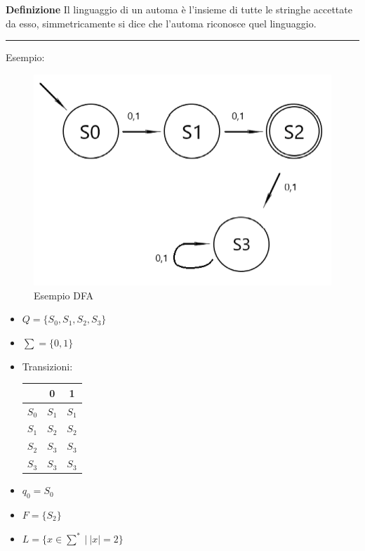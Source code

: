 \documentclass{article}
\begin{document}
\noindent\textbf{Definizione} Il linguaggio di un automa è l'insieme di tutte le stringhe accettate da esso, simmetricamente si dice che l'automa riconosce quel linguaggio.\newline

\newpage

\noindent\rule{\textwidth}{0.5pt}\newline

\noindent Esempio:\newline

\begin{figure}[ht]
    \centering
    \includegraphics[width=0.7\linewidth]{DFA.png}
    \caption{Esempio DFA}
    \label{fig:dfa}
\end{figure}

\begin{itemize}
    \item $Q=\{S_0,S_1,S_2,S_3\}$
    \item $\sum = \{0,1\}$
    \item Transizioni:

        \begin{table}[ht]
            \centering
            \begin{tabular}{c|c|c}
                 & 0 & 1\\
                 \hline
                $S_0$ & $S_1$ & $S_1$\\
                \hline
                $S_1$ & $S_2$ & $S_2$\\
                \hline
                $S_2$ & $S_3$ & $S_3$\\
                \hline
                $S_3$ & $S_3$ & $S_3$\\
            \end{tabular}
            \label{tab:dfa}
        \end{table}
    
    \item $q_0=S_0$
    \item $F=\{S_2\}$
    \item $L=\{x\in \sum^*\ |\ |x|=2\}$
\end{itemize}
\end{document}
